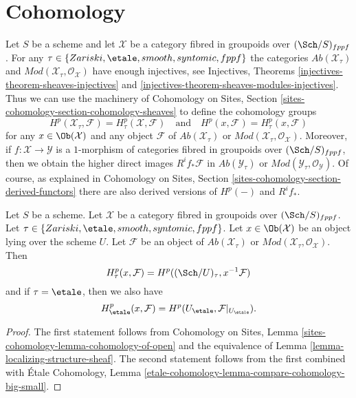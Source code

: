 \section{Cohomology}
\label{section-cohomology-general}

\noindent
Let $S$ be a scheme and let $\mathcal{X}$ be a category fibred in groupoids
over $(\Sch/S)_{fppf}$. For any $\tau \in \{Zariski, \etale, smooth,
syntomic, fppf\}$ the categories $\textit{Ab}(\mathcal{X}_\tau)$ and
$\textit{Mod}(\mathcal{X}_\tau, \mathcal{O}_\mathcal{X})$ have
enough injectives, see
Injectives, Theorems \ref{injectives-theorem-sheaves-injectives} and
\ref{injectives-theorem-sheaves-modules-injectives}.
Thus we can use the machinery of
Cohomology on Sites, Section \ref{sites-cohomology-section-cohomology-sheaves}
to define the cohomology groups
$$
H^p(\mathcal{X}_\tau, \mathcal{F}) = H^p_\tau(\mathcal{X}, \mathcal{F})
\quad\text{and}\quad
H^p(x, \mathcal{F}) = H^p_\tau(x, \mathcal{F})
$$
for any $x \in \Ob(\mathcal{X})$ and any object $\mathcal{F}$ of
$\textit{Ab}(\mathcal{X}_\tau)$ or
$\textit{Mod}(\mathcal{X}_\tau, \mathcal{O}_\mathcal{X})$. Moreover, if
$f : \mathcal{X} \to \mathcal{Y}$ is a $1$-morphism of categories fibred
in groupoids over $(\Sch/S)_{fppf}$, then we obtain the higher direct
images $R^if_*\mathcal{F}$ in $\textit{Ab}(\mathcal{Y}_\tau)$ or
$\textit{Mod}(\mathcal{Y}_\tau, \mathcal{O}_\mathcal{Y})$.
Of course, as explained in
Cohomology on Sites, Section \ref{sites-cohomology-section-derived-functors}
there are also derived versions of $H^p(-)$ and $R^if_*$.

\begin{lemma}
\label{lemma-cohomology-restriction}
Let $S$ be a scheme. Let $\mathcal{X}$ be a category fibred in groupoids
over $(\Sch/S)_{fppf}$. Let $\tau \in \{Zariski, \etale, smooth,
syntomic, fppf\}$. Let $x \in \Ob(\mathcal{X})$ be an object lying
over the scheme $U$. Let $\mathcal{F}$ be
an object of $\textit{Ab}(\mathcal{X}_\tau)$ or
$\textit{Mod}(\mathcal{X}_\tau, \mathcal{O}_\mathcal{X})$. Then
$$
H^p_\tau(x, \mathcal{F}) = H^p((\Sch/U)_\tau, x^{-1}\mathcal{F})
$$
and if $\tau = \etale$, then we also have
$$
H^p_\etale(x, \mathcal{F}) =
H^p(U_\etale, \mathcal{F}|_{U_\etale}).
$$
\end{lemma}

\begin{proof}
The first statement follows from
Cohomology on Sites, Lemma \ref{sites-cohomology-lemma-cohomology-of-open}
and the equivalence of 
Lemma \ref{lemma-localizing-structure-sheaf}.
The second statement follows from the first combined with
\'Etale Cohomology, Lemma
\ref{etale-cohomology-lemma-compare-cohomology-big-small}.
\end{proof}














